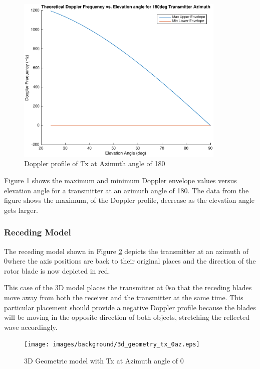 \begin{figure}
	\begin{center}
		\includegraphics[width=10cm]{images/background/3d_geometry_tx_180az_doppler_profile.eps}
		\caption{Doppler profile of Tx at Azimuth angle of 180\textdegree}
		\label{fig:3D_model_180az_doppler}
	\end{center}
\end{figure}

Figure \ref{fig:3D_model_180az_doppler} shows the maximum and minimum Doppler envelope values versus elevation angle for a transmitter at an azimuth angle of 180\textdegree. The data from the figure shows the maximum, of the Doppler profile, decrease as the elevation angle gets larger.

\subsubsection{Receding Model}
The receding model shown in Figure \ref{fig:3D_model_0az} depicts the transmitter at an azimuth of 0\textdegree \space where the axis positions are back to their original places and the direction of the rotor blade is now depicted in red.

This case of the 3D model places the transmitter at 0\textdegree \space so that the receding blades move away from both the receiver and the transmitter at the same time. This particular placement should provide a negative Doppler profile because the blades will be moving in the opposite direction of both objects, stretching the reflected wave accordingly.

\begin{figure}
	\begin{center}
		\texttt{[image: images/background/3d\_geometry\_tx\_0az.eps]}
		\caption{3D Geometric model with Tx at Azimuth angle of 0\textdegree}
		\label{fig:3D_model_0az}
	\end{center}
\end{figure}


